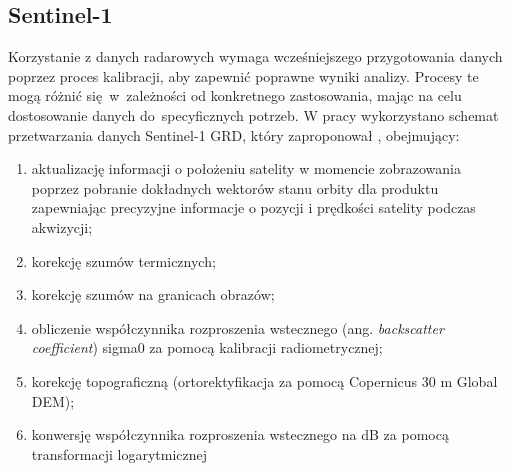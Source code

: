 \documentclass{amuthesis}
\begin{document}
\hypertarget{sec-processing-s1}{%
\subsection{Sentinel-1}\label{sec-processing-s1}}

Korzystanie z danych radarowych wymaga wcześniejszego przygotowania
danych poprzez proces kalibracji, aby zapewnić poprawne wyniki analizy.
Procesy te mogą różnić się~w~zależności od konkretnego zastosowania,
mając na celu dostosowanie danych do~specyficznych potrzeb. W pracy
wykorzystano schemat przetwarzania danych Sentinel-1 GRD, który
zaproponował \textcite{filipponi_2019_s1_workflow}, obejmujący:

\begin{enumerate}
\def\labelenumi{\arabic{enumi}.}
\item
  aktualizację informacji o położeniu satelity w momencie zobrazowania
  poprzez pobranie dokładnych wektorów stanu orbity dla produktu
  zapewniając precyzyjne informacje o pozycji i prędkości satelity
  podczas akwizycji;
\item
  korekcję szumów termicznych;
\item
  korekcję szumów na granicach obrazów;
\item
  obliczenie współczynnika rozproszenia wstecznego (ang.
  \emph{backscatter coefficient}) sigma0 za pomocą kalibracji
  radiometrycznej;
\item
  korekcję topograficzną (ortorektyfikacja za pomocą Copernicus 30 m
  Global DEM);
\item
  konwersję współczynnika rozproszenia wstecznego na dB za pomocą
  transformacji logarytmicznej
\end{enumerate}
\end{document}
